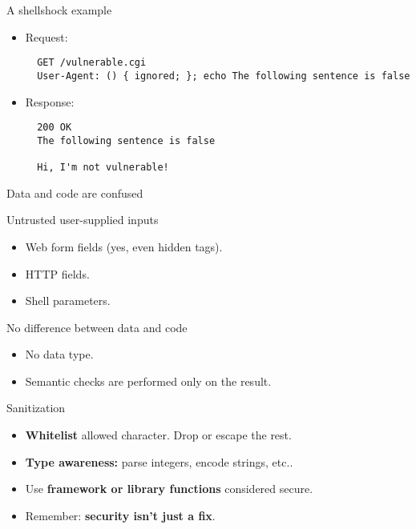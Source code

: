\begin{frame}[fragile]{A shellshock example}

  \begin{itemize}
    \item Request:
  \begin{lstlisting}
  GET /vulnerable.cgi
  User-Agent: () { ignored; }; echo The following sentence is false
  \end{lstlisting}
\pause
    \item Response:
  \begin{lstlisting}
  200 OK
  The following sentence is false

  Hi, I'm not vulnerable!
  \end{lstlisting}
  \end{itemize}
\end{frame}

\begin{frame}{Data and code are confused}
\begin{block}{Untrusted user-supplied inputs}
  \begin{itemize}
    \item Web form fields (yes, even hidden tags).
    \item HTTP fields.
    \item Shell parameters.
  \end{itemize}
\end{block}

\begin{block}{No difference between data and code}
  \begin{itemize}
    \item No data type.
    \item Semantic checks are performed only on the result.
  \end{itemize}
\end{block}
\end{frame}

\begin{frame}{Sanitization}
  \begin{itemize}
    \item \textbf{Whitelist} allowed character. Drop or escape the rest.
    \item \textbf{Type awareness:} parse integers, encode strings, etc..
    \item Use \textbf{framework or library functions} considered secure.
    \item Remember: \textbf{security isn't just a fix}.
  \end{itemize}
\end{frame}
